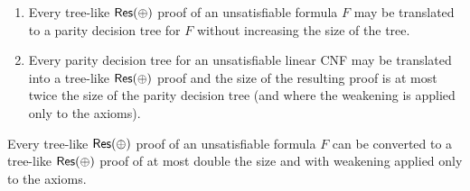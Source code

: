 \begin{theorem}
    \;
    \begin{enumerate}
        \item Every tree-like $\mathsf{Res(\oplus)}$ proof of an unsatisfiable formula $F$ may be translated to a parity decision tree for $F$ without increasing the size of the tree.
        
        \item Every parity decision tree for an unsatisfiable linear CNF may be translated into a tree-like $\mathsf{Res(\oplus)}$ proof and the size of the resulting proof is at most twice the size of the parity decision tree (and where the weakening is applied only to the axioms).
    \end{enumerate}
\end{theorem}

\begin{corollary}
    Every tree-like $\mathsf{Res(\oplus)}$ proof of an unsatisfiable formula $F$ can be converted to a tree-like $\mathsf{Res(\oplus)}$ proof of at most double the size and with weakening applied only to the axioms.
\end{corollary}


\cleardoublepage